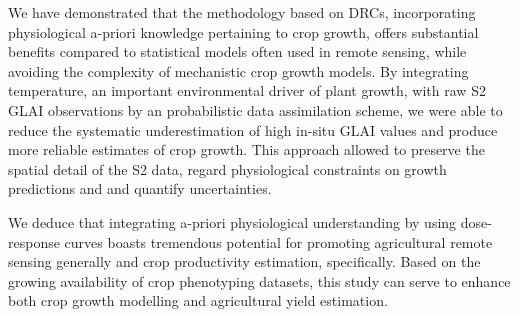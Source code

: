 We have demonstrated that the methodology based on \gls{DRC}s, incorporating physiological a-priori knowledge pertaining to crop growth, offers substantial benefits compared to statistical models often used in remote sensing, while avoiding the complexity of mechanistic crop growth models. By integrating temperature, an important environmental driver of plant growth, with raw \gls{S2} \gls{GLAI} observations by an probabilistic data assimilation scheme, we were able to reduce the systematic underestimation of high in-situ \gls{GLAI} values and produce more reliable estimates of crop growth. This approach allowed to preserve the spatial detail of the \gls{S2} data, regard physiological constraints on growth predictions and and quantify uncertainties.

We deduce that integrating a-priori physiological understanding by using dose-response curves boasts tremendous potential for promoting agricultural remote sensing generally and crop productivity estimation, specifically. Based on the growing availability of crop phenotyping datasets, this study can serve to enhance both crop growth modelling and agricultural yield estimation.
